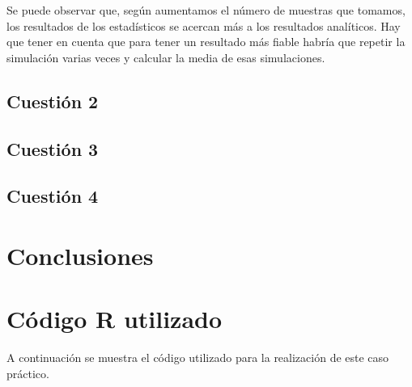 \documentclass[12pt,a4paper,twoside,openright,titlepage,final]{article}
\begin{document}
Se puede observar que, según aumentamos el número de muestras que tomamos, los resultados de los estadísticos se acercan más a los resultados analíticos. Hay que tener en cuenta que para tener un resultado más fiable habría que repetir la simulación varias veces y calcular la media de esas simulaciones.


\subsection{Cuestión 2}

\subsection{Cuestión 3}

\subsection{Cuestión 4}

\section{Conclusiones}


\newpage

\section{Código R utilizado}

A continuación se muestra el código utilizado para la realización de este caso práctico.
\end{document}
